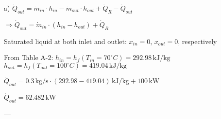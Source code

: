a) \( \dot{Q}_{out} = \dot{m}_{in} \cdot h_{in} - \dot{m}_{out} \cdot h_{out} + \dot{Q}_R - \dot{Q}_{out} \)  

\( \Rightarrow \dot{Q}_{out} = \dot{m}_{in} \cdot (h_{in} - h_{out}) + \dot{Q}_R \)  

Saturated liquid at both inlet and outlet:  
\( x_{in} = 0 \), \( x_{out} = 0 \), respectively  

From Table A-2:  
\( h_{in} = h_f(T_{in} = 70^\circ C) = 292.98 \, \text{kJ/kg} \)  
\( h_{out} = h_f(T_{out} = 100^\circ C) = 419.04 \, \text{kJ/kg} \)  

\( \dot{Q}_{out} = 0.3 \, \text{kg/s} \cdot (292.98 - 419.04) \, \text{kJ/kg} + 100 \, \text{kW} \)  

\( \dot{Q}_{out} = 62.482 \, \text{kW} \)  

---